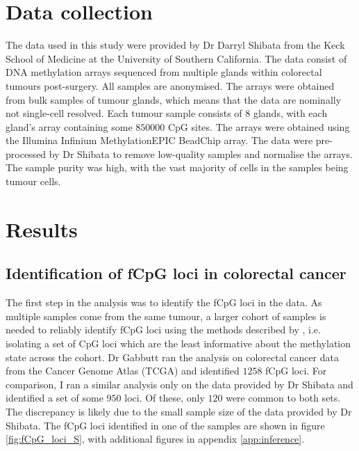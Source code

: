 \section{Data collection}
The data used in this study were provided by Dr Darryl Shibata from the Keck
School of Medicine at the University of Southern California. The data consist
of DNA methylation arrays sequenced from multiple glands within colorectal
tumours post-surgery. All samples are anonymised. The arrays were obtained from
bulk samples of tumour glands, which means that the data are nominally not
single-cell resolved. Each tumour sample consists of $8$ glands, with each
gland's array containing some $850000$ CpG sites. The arrays were obtained
using the Illumina Infinium MethylationEPIC BeadChip array. The data were
pre-processed by Dr Shibata to remove low-quality samples and normalise the
arrays. The sample purity was high, with the vast majority of cells in the
samples being tumour cells.

\section{Results}
\subsection{Identification of fCpG loci in colorectal cancer}
The first step in the analysis was to identify the fCpG loci in the data. As
multiple samples come from the same tumour, a larger cohort of samples is
needed to reliably identify fCpG loci using the methods described by
\cite{gabbutt_evolutionary_2023}, i.e. isolating a set of CpG loci which are
the least informative about the methylation state across the cohort. Dr Gabbutt
ran the analysis on colorectal cancer data from the Cancer Genome Atlas (TCGA)
and identified $1258$ fCpG loci. For comparison, I ran a similar analysis only
on the data provided by Dr Shibata and identified a set of some $950$ loci. Of
these, only $120$ were common to both sets. The discrepancy is likely due to
the small sample size of the data provided by Dr Shibata. The fCpG loci
identified in one of the samples are shown in figure \ref{fig:fCpG_loci_S},
with additional figures in appendix \ref{app:inference}.

